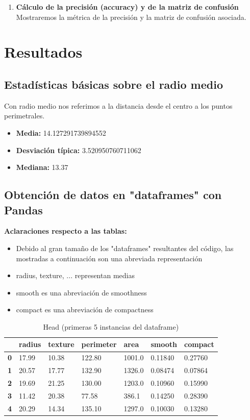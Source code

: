 \documentclass{llncs}
\begin{document}
{\begin{enumerate}
  \item \textbf{Cálculo de la precisión (accuracy) y de la  matriz de confusión}\\
    Mostraremos la métrica de la precisión y la matriz de confusión asociada.
\end{enumerate}
}

\section{Resultados}

\subsection{Estadísticas básicas sobre el radio medio}
Con radio medio nos referimos a la distancia desde el centro a los puntos perimetrales.
\begin{itemize}
  \item \textbf{Media:} 14.127291739894552
  \item \textbf{Desviación típica:} 3.520950760711062
  \item \textbf{Mediana:} 13.37
\end{itemize}

\subsection{Obtención de datos en "dataframes" con Pandas}
\textbf{Aclaraciones respecto a las tablas:}
    \begin{itemize}
        \item Debido al gran tamaño de los "dataframes" resultantes del código, las mostradas a continuación son una abreviada representación
        \item radius, texture, ... representan medias
        \item smooth es una abreviación de smoothness
        \item compact es una abreviación de compactness
    \end{itemize}


\begin{table}[H]
    \label{tab:tabla1}
 	\caption{Head (primeras 5 instancias del dataframe)}
	\centering
	\begin{tabular}{C|CCCCCC}
 		\toprule
 		  & \textbf{radius} & \textbf{texture} & \textbf{perimeter} & \textbf{area} & \textbf{smooth} & \textbf{compact}\\
 		\midrule
 		\textbf{0} & 17.99 & 10.38 & 122.80 & 1001.0 & 0.11840 & 0.27760 \\ 
   		\textbf{1} & 20.57 & 17.77 & 132.90 & 1326.0 & 0.08474 & 0.07864 \\
        \textbf{2} & 19.69 & 21.25 & 130.00 & 1203.0 & 0.10960 & 0.15990 \\
        \textbf{3} & 11.42 & 20.38 & 77.58 & 386.1 & 0.14250 & 0.28390 \\
        \textbf{4} & 20.29 & 14.34 & 135.10 & 1297.0 & 0.10030 & 0.13280 \\
 		\bottomrule
 	\end{tabular}
\end{table}
\end{document}
